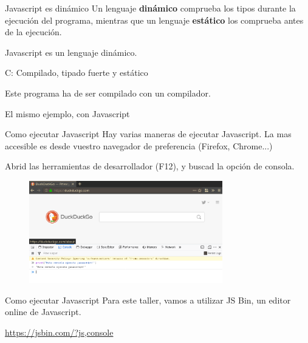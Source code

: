 \documentclass{beamer}
\begin{document}
\begin{frame}{Javascript es dinámico}
        \pause
        Un lenguaje \textbf{dinámico} comprueba los tipos durante la ejecución del programa, mientras que un lenguaje \textbf{estático} los comprueba antes de la ejecución.\pause
        \centering
        
        Javascript es un lenguaje dinámico.
\end{frame}
\begin{frame}[fragile]{C: Compilado, tipado fuerte y estático}\pause
        \centering
        
        Este programa ha de ser compilado con un compilador.
\end{frame}

\begin{frame}[fragile]{El mismo ejemplo, con Javascript}\pause
        \centering
\end{frame}

\begin{frame}{Como ejecutar Javascript}\pause
    Hay varias maneras de ejecutar Javascript. La mas accesible es desde vuestro navegador de preferencia (Firefox, Chrome...)\pause
    
    Abrid las herramientas de desarrollador (F12), y buscad la opción de consola.
    \begin{figure}
        \centering
        \includegraphics[width=0.75\textwidth]{images/firefox_dev.png}
    \end{figure}
\end{frame}

\begin{frame}{Como ejecutar Javascript}
Para este taller, vamos a utilizar JS Bin, un editor online de Javascript.
    
\centering\url{https://jsbin.com/?js,console}
\end{frame}
\end{document}
